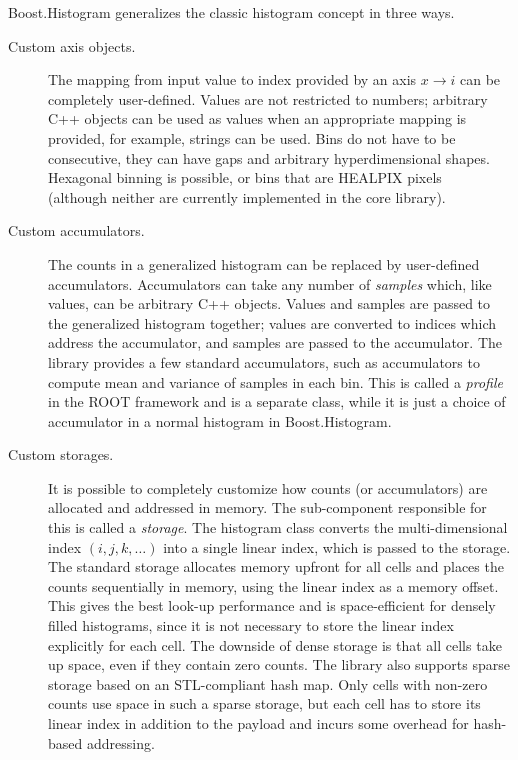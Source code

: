 \documentclass{webofc}
\begin{document}
Boost.Histogram generalizes the classic histogram concept in three ways.
\begin{description}
\item[Custom axis objects.] The mapping from input value to index provided by an axis $x \rightarrow i$ can be completely user-defined. Values are not restricted to numbers; arbitrary C++ objects can be used as values when an appropriate mapping is provided, for example, strings can be used. Bins do not have to be consecutive, they can have gaps and arbitrary hyperdimensional shapes. Hexagonal binning is possible, or bins that are HEALPIX pixels~\cite{gorski2005healpix} (although neither are currently implemented in the core library).

\item[Custom accumulators.] The counts in a generalized histogram can be replaced by user-defined accumulators. Accumulators can take any number of \emph{samples} which, like values, can be arbitrary C++ objects. Values and samples are passed to the generalized histogram together; values are converted to indices which address the accumulator, and samples are passed to the accumulator. The library provides a few standard accumulators, such as accumulators to compute mean and variance of samples in each bin. This is called a \emph{profile} in the ROOT framework and is a separate class, while it is just a choice of accumulator in a normal histogram in Boost.Histogram.

\item[Custom storages.] It is possible to completely customize how counts (or accumulators) are allocated and addressed in memory. The sub-component responsible for this is called a \emph{storage}. The histogram class converts the multi-dimensional index $(i,j,k,\dots)$ into a single linear index, which is passed to the storage. The standard storage allocates memory upfront for all cells and places the counts sequentially in memory, using the linear index as a memory offset. This gives the best look-up performance and is space-efficient for densely filled histograms, since it is not necessary to store the linear index explicitly for each cell. The downside of dense storage is that all cells take up space, even if they contain zero counts. The library also supports sparse storage based on an STL-compliant hash map. Only cells with non-zero counts use space in such a sparse storage, but each cell has to store its linear index in addition to the payload and incurs some overhead for hash-based addressing.


\end{description}
\end{document}
